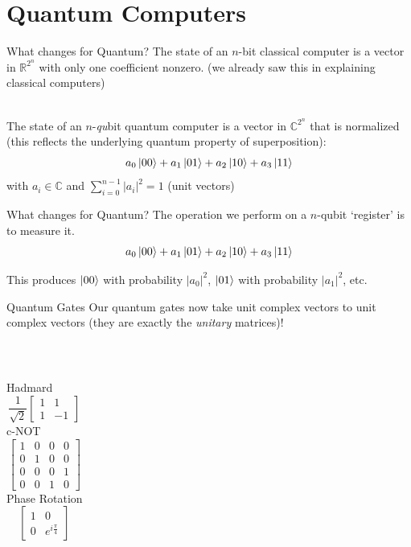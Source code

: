 \documentclass{beamer}
\begin{document}
\section{Quantum Computers}
\begin{frame}{What changes for Quantum?}
    The state of an $n$-bit classical computer is a vector in $\mathbb{R}^{2^n}$ with only one coefficient nonzero. (we already saw this in explaining classical computers) \pause
    
    \ \\
    The state of an $n$-\textit{qu}bit quantum computer is a vector in $\mathbb{C}^{2^n}$ that is normalized (this reflects the underlying quantum property of superposition): \[
        a_0 \ket{00} +  a_1 \ket{01} + a_2 \ket{10} + a_3 \ket{11}
    \]
    with $a_i \in \mathbb{C}$ and $\sum_{i=0}^{n-1} |a_i|^2 = 1$ (unit vectors)
\end{frame}
\begin{frame}{What changes for Quantum?}
    The operation we perform on a $n$-qubit `register' is to measure it. \pause
    \[
        a_0 \ket{00} +  a_1 \ket{01} + a_2 \ket{10} + a_3 \ket{11}
    \] \pause
    
    This produces $\ket{00}$ with probability $|a_0|^2$, $\ket{01}$ with probability $|a_1|^2$, etc.
\end{frame}
\begin{frame}{Quantum Gates}
    Our quantum gates now take unit complex vectors to unit complex vectors (they are exactly the \textit{unitary} matrices)! \pause
    
    \ \\
    
\begin{columns}
   \centering Hadmard
   \[
   \frac{1}{\sqrt{2}}
   \begin{bmatrix}
   1 & 1  \\
   1 & -1
   \end{bmatrix}
   \] 
   \pause \centering c-NOT
   \[
   \begin{bmatrix}
   1 & 0 & 0 & 0\\
   0 & 1 & 0 & 0\\
   0 & 0 & 0 & 1\\
   0 & 0 & 1 & 0
   \end{bmatrix}
   \]
   \pause \centering Phase Rotation
   \[
   \begin{bmatrix}
   1 & 0 \\
   0 & e^{i \frac{\pi}{4}}
   \end{bmatrix}
   \]
\end{columns}
\end{frame}
\end{document}
